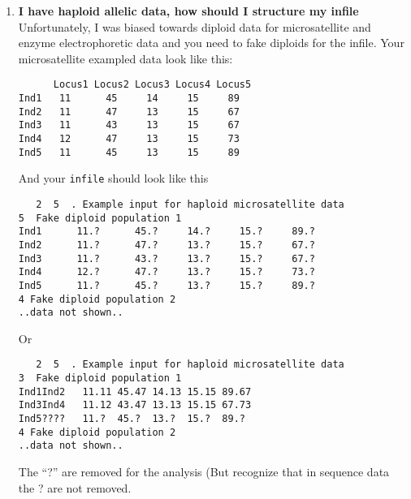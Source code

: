 \begin{enumerate}
\item {\bf I have haploid allelic data, how should I structure my infile}\\
Unfortunately, I was biased towards diploid data for microsatellite and 
enzyme electrophoretic data and you need to fake diploids for the infile.
Your microsatellite exampled data look like this:
\begin{tt}
\begin{verbatim}
      Locus1 Locus2 Locus3 Locus4 Locus5
Ind1   11      45     14     15     89
Ind2   11      47     13     15     67
Ind3   11      43     13     15     67
Ind4   12      47     13     15     73
Ind5   11      45     13     15     89
\end{verbatim}
\end{tt}
And your {\tt infile} should look like this
\begin{tt}
\begin{verbatim}
   2  5  . Example input for haploid microsatellite data
5  Fake diploid population 1
Ind1      11.?      45.?     14.?     15.?     89.?
Ind2      11.?      47.?     13.?     15.?     67.?
Ind3      11.?      43.?     13.?     15.?     67.?
Ind4      12.?      47.?     13.?     15.?     73.?
Ind5      11.?      45.?     13.?     15.?     89.?
4 Fake diploid population 2
..data not shown..
\end{verbatim}
\end{tt}
Or
\begin{tt}
\begin{verbatim}
   2  5  . Example input for haploid microsatellite data
3  Fake diploid population 1
Ind1Ind2   11.11 45.47 14.13 15.15 89.67
Ind3Ind4   11.12 43.47 13.13 15.15 67.73
Ind5????   11.?  45.?  13.?  15.?  89.?
4 Fake diploid population 2
..data not shown..
\end{verbatim}
\end{tt}
The ``?'' are removed for the analysis (But recognize that in sequence data the 
? are not removed.


\end{enumerate}
